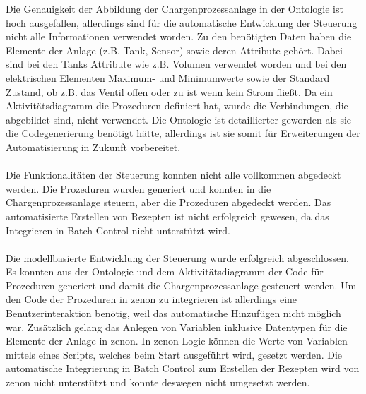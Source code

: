 Die Genauigkeit der Abbildung der Chargenprozessanlage in der Ontologie ist hoch ausgefallen, allerdings sind für die automatische Entwicklung der Steuerung nicht alle Informationen verwendet worden. Zu den benötigten Daten haben die Elemente der Anlage (z.B. Tank, Sensor) sowie deren Attribute gehört. Dabei sind bei den Tanks Attribute wie z.B. Volumen verwendet worden und bei den elektrischen Elementen Maximum- und Minimumwerte sowie der Standard Zustand, ob z.B. das Ventil offen oder zu ist wenn kein Strom fließt. Da ein Aktivitätsdiagramm die Prozeduren definiert hat, wurde die Verbindungen, die abgebildet sind, nicht verwendet.
Die Ontologie ist detaillierter geworden als sie die Codegenerierung benötigt hätte, allerdings ist sie somit für Erweiterungen der Automatisierung in Zukunft vorbereitet. 
\\\\
Die Funktionalitäten der Steuerung konnten nicht alle vollkommen abgedeckt werden. Die Prozeduren wurden generiert und konnten in die Chargenprozessanlage steuern, aber  die Prozeduren abgedeckt werden. Das automatisierte Erstellen von Rezepten ist nicht erfolgreich gewesen, da das Integrieren in Batch Control nicht unterstützt wird. 
\\\\
Die modellbasierte Entwicklung der Steuerung wurde erfolgreich abgeschlossen. Es konnten aus der Ontologie und dem Aktivitätsdiagramm der Code für Prozeduren generiert und damit die Chargenprozessanlage gesteuert werden. Um den Code der Prozeduren in zenon zu integrieren ist allerdings eine Benutzerinteraktion benötig, weil das automatische Hinzufügen nicht möglich war. Zusätzlich gelang das Anlegen von Variablen inklusive Datentypen für die Elemente der Anlage in zenon. In zenon Logic können die Werte von Variablen mittels eines Scripts, welches beim Start ausgeführt wird, gesetzt werden. 
Die automatische Integrierung in Batch Control zum Erstellen der Rezepten wird von zenon nicht unterstützt und konnte deswegen nicht umgesetzt werden. 

















